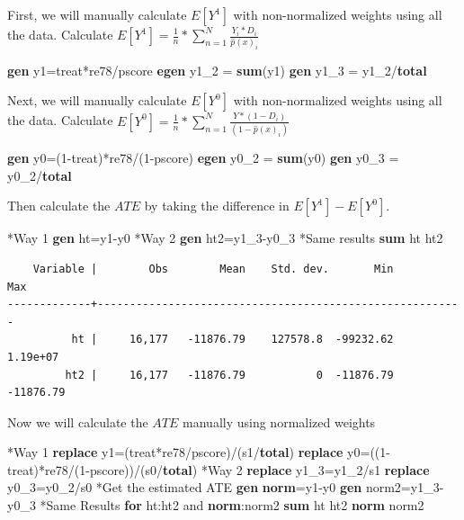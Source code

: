 \documentclass[
]{book}
\newenvironment{Shaded}{\begin{snugshade}}{\end{snugshade}}
\newcommand{\FunctionTok}[1]{\textcolor[rgb]{0.13,0.29,0.53}{\textbf{#1}}}
\newcommand{\KeywordTok}[1]{\textcolor[rgb]{0.13,0.29,0.53}{\textbf{#1}}}
\newcommand{\NormalTok}[1]{#1}
\begin{document}
First, we will manually calculate \(E[Y^1]\) with non-normalized weights using all the data. Calculate \(E[Y^1]=\frac{1}{n}*\sum_{n=1}^{N}\frac{Y_i*D_i}{\hat{p}(x)_i}\)

\begin{Shaded}
\begin{Highlighting}[]
\KeywordTok{gen}\NormalTok{ y1=treat*re78/pscore}
\KeywordTok{egen}\NormalTok{ y1\_2 = }\KeywordTok{sum}\NormalTok{(y1)}
\KeywordTok{gen}\NormalTok{ y1\_3 = y1\_2/}\KeywordTok{total}
\end{Highlighting}
\end{Shaded}

Next, we will manually calculate \(E[Y^0]\) with non-normalized weights using all the data. Calculate \(E[Y^0]=\frac{1}{n}*\sum_{n=1}^{N}\frac{Y*(1-D_i)}{(1-\hat{p}(x)_i)}\)

\begin{Shaded}
\begin{Highlighting}[]
\KeywordTok{gen}\NormalTok{ y0=(1{-}treat)*re78/(1{-}pscore) }
\KeywordTok{egen}\NormalTok{ y0\_2 = }\KeywordTok{sum}\NormalTok{(y0)}
\KeywordTok{gen}\NormalTok{ y0\_3 = y0\_2/}\KeywordTok{total}
\end{Highlighting}
\end{Shaded}

Then calculate the \(ATE\) by taking the difference in \(E[Y^1]-E[Y^0]\).

\begin{Shaded}
\begin{Highlighting}[]
\NormalTok{*Way 1}
\KeywordTok{gen}\NormalTok{ ht=y1{-}y0}
\NormalTok{*Way 2}
\KeywordTok{gen}\NormalTok{ ht2=y1\_3{-}y0\_3}
\NormalTok{*Same results}
\KeywordTok{sum}\NormalTok{ ht ht2}
\end{Highlighting}
\end{Shaded}

\begin{verbatim}
    Variable |        Obs        Mean    Std. dev.       Min        Max
-------------+---------------------------------------------------------
          ht |     16,177   -11876.79    127578.8  -99232.62   1.19e+07
         ht2 |     16,177   -11876.79           0  -11876.79  -11876.79
\end{verbatim}

Now we will calculate the \(ATE\) manually using normalized weights

\begin{Shaded}
\begin{Highlighting}[]
\NormalTok{*Way 1}
\KeywordTok{replace}\NormalTok{ y1=(treat*re78/pscore)/(s1/}\KeywordTok{total}\NormalTok{)}
\KeywordTok{replace}\NormalTok{ y0=((1{-}treat)*re78/(1{-}pscore))/(s0/}\KeywordTok{total}\NormalTok{)}
\NormalTok{*Way 2}
\KeywordTok{replace}\NormalTok{ y1\_3=y1\_2/s1}
\KeywordTok{replace}\NormalTok{ y0\_3=y0\_2/s0}
\NormalTok{*Get the estimated ATE}
\KeywordTok{gen} \FunctionTok{norm}\NormalTok{=y1{-}y0}
\KeywordTok{gen}\NormalTok{ norm2=y1\_3{-}y0\_3}
\NormalTok{*Same Results }\KeywordTok{for}\NormalTok{ ht:ht2 and }\FunctionTok{norm}\NormalTok{:norm2}
\KeywordTok{sum}\NormalTok{ ht ht2 }\FunctionTok{norm}\NormalTok{ norm2}
\end{Highlighting}
\end{Shaded}
\end{document}
